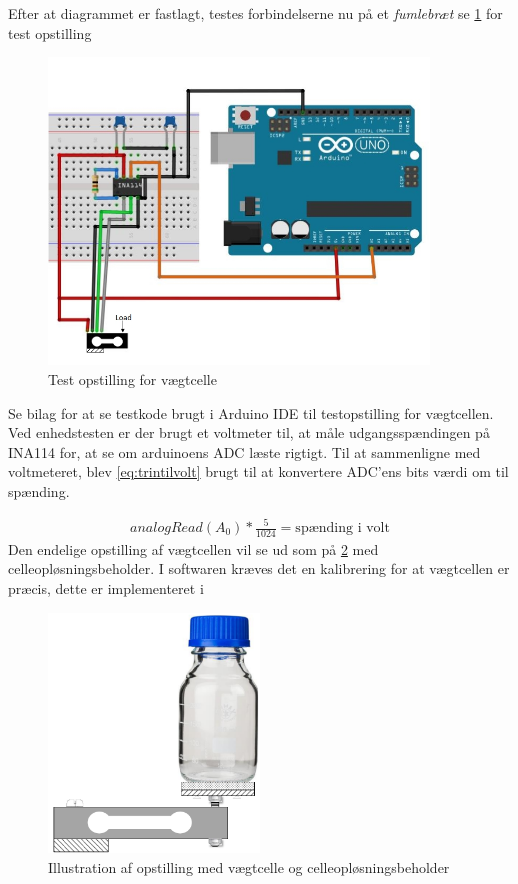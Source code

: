 Efter at diagrammet er fastlagt, testes forbindelserne nu på et \textit{fumlebræt} se \ref{fig:loadcelltest} for test opstilling
  \begin{figure}[H]
	\centering
	\includegraphics[width=0.9\textwidth]{billeder/Hardware/diagrammer/Drawing1.jpg}
	\caption{Test opstilling for vægtcelle}
	\label{fig:loadcelltest}
\end{figure}
 Se bilag for at se testkode brugt i Arduino IDE til testopstilling for vægtcellen. Ved enhedstesten er der brugt et voltmeter til, at måle udgangsspændingen på INA114 for, at se om arduinoens ADC læste rigtigt. Til at sammenligne med voltmeteret, blev \ref{eq:trintilvolt} brugt til at konvertere ADC'ens bits værdi om til spænding.
 
 \begin{align}
 analogRead(A_0)*\frac{5}{1024}=\text{spænding i volt}
 \label{eq:trintilvolt}
 \end{align}
Den endelige opstilling af vægtcellen vil se ud som på \ref{fig:loadcell_mont} med celleopløsningsbeholder. I softwaren kræves det en kalibrering for at vægtcellen er præcis, dette er implementeret i 
 
 \begin{figure}[H]
	\centering
	\includegraphics[width=0.5\textwidth]{billeder/Hardware/diagrammer/loadcell_montering.pdf}
	\caption{Illustration af opstilling med vægtcelle og celleopløsningsbeholder}
	\label{fig:loadcell_mont}
\end{figure}

